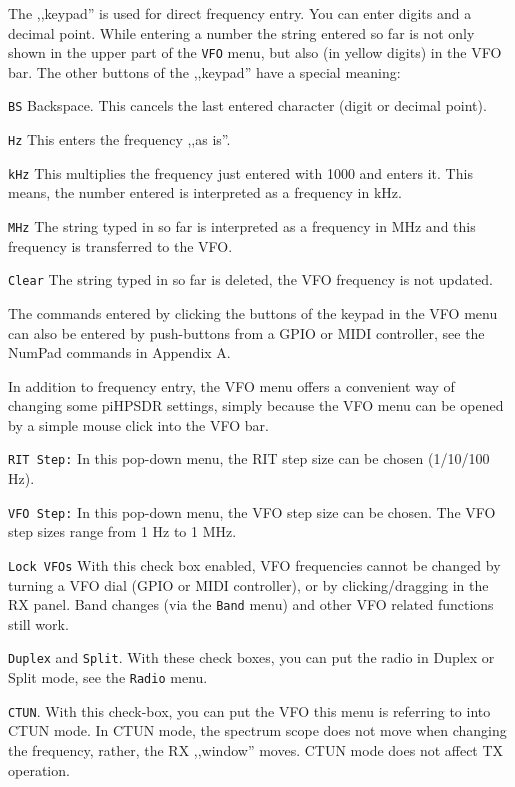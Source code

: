 \documentclass[12pt]{book}
\def\rett#1{\texttt{\color{red}#1}}
\def\bltt#1{\texttt{\color{blue}#1}}
\def\pH{pi\-HPSDR\xspace}
\begin{document}
The ,,keypad'' is used for direct frequency entry. You can enter
digits and a decimal point. While entering a number the string
entered so far is not only shown in the upper part of the
\bltt{VFO} menu, but also (in yellow digits) in the VFO bar.
The other buttons of the ,,keypad'' have a special meaning:



\rett{BS} Backspace. This cancels the last entered character
(digit or decimal point).

\rett{Hz} This enters the frequency ,,as is''.

\rett{kHz} This multiplies the frequency just entered with 1000 and
enters it. This means, the number entered is interpreted as a
frequency in kHz.

\rett{MHz} The string typed in so far is interpreted as a frequency in MHz
and this frequency is transferred to the VFO.

\rett{Clear} The string typed in so far is deleted, the VFO frequency is not
updated.

The commands entered by clicking the buttons of the keypad in the VFO menu
can also be entered by push-buttons from a GPIO or MIDI controller, see
the NumPad commands in Appendix A.

In addition to frequency entry, the VFO menu offers a convenient way of changing
some \pH settings, simply because the VFO menu can be opened by a simple
mouse click into the VFO bar.

\rett{RIT Step:} In this pop-down menu, the RIT step size can be chosen (1/10/100 Hz).

\rett{VFO Step:} In this pop-down menu, the VFO step size can be chosen. The VFO step
sizes range from 1 Hz to 1 MHz.

\rett{Lock VFOs} With this check box enabled, VFO frequencies cannot be changed by
turning a VFO dial (GPIO or MIDI controller), or by clicking/dragging in the RX panel.
Band changes (via the \bltt{Band} menu) and other VFO related functions still work.

\rett{Duplex} and \rett{Split}. With these check boxes, you can put the radio
in Duplex or Split mode, see the \bltt{Radio} menu.

\rett{CTUN}. With this check-box, you can put the VFO this menu is referring to into
CTUN mode. In CTUN mode, the spectrum scope does not move when changing the frequency,
rather, the RX ,,window'' moves. CTUN mode does not affect TX operation.

\end{document}

